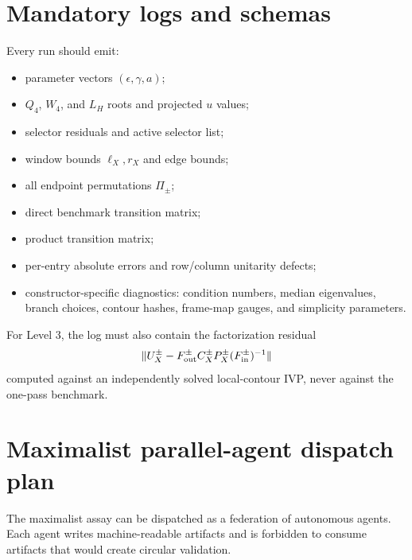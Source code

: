 \documentclass[11pt]{article}
\begin{document}
\section{Mandatory logs and schemas}

Every run should emit:
\begin{itemize}
  \item parameter vectors $(\epsilon,\gamma,a)$;
  \item $Q_4$, $W_4$, and $L_H$ roots and projected $u$ values;
  \item selector residuals and active selector list;
  \item window bounds $\ell_X,r_X$ and edge bounds;
  \item all endpoint permutations $\Pi_\pm$;
  \item direct benchmark transition matrix;
  \item product transition matrix;
  \item per-entry absolute errors and row/column unitarity defects;
  \item constructor-specific diagnostics: condition numbers, median eigenvalues, branch choices, contour hashes, frame-map gauges, and simplicity parameters.
\end{itemize}

For Level 3, the log must also contain the factorization residual
\begin{equation}
\|U_X^\pm-F_{\rm out}^\pm C_X^\pm P_X^\pm(F_{\rm in}^\pm)^{-1}\|
\end{equation}
computed against an independently solved local-contour IVP, never against the one-pass benchmark.

\section{Maximalist parallel-agent dispatch plan}

The maximalist assay can be dispatched as a federation of autonomous agents. Each agent writes machine-readable artifacts and is forbidden to consume artifacts that would create circular validation.
\end{document}
